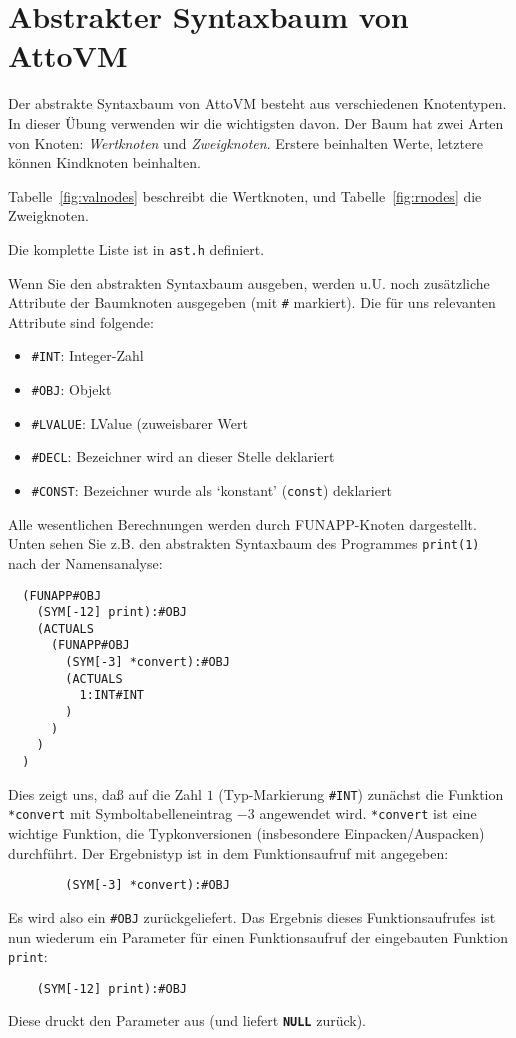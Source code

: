 \documentclass[11pt,a4paper]{article}
\newcommand{\Ckw}[1]{\textbf{\texttt{#1}}}
\begin{document}
\section{Abstrakter Syntaxbaum von AttoVM}\label{a:ast}

Der abstrakte Syntaxbaum von AttoVM besteht aus verschiedenen Knotentypen.  In dieser Übung verwenden wir die wichtigsten davon.
Der Baum hat zwei Arten von Knoten: \emph{Wertknoten} und \emph{Zweigknoten}.  Erstere beinhalten Werte, letztere können
Kindknoten beinhalten.

Tabelle~\ref{fig:valnodes} beschreibt die Wertknoten, und Tabelle~\ref{fig:rnodes} die Zweigknoten.

Die komplette Liste ist in \texttt{ast.h} definiert.

Wenn Sie den abstrakten Syntaxbaum ausgeben, werden u.U. noch
zusätzliche Attribute der Baumknoten ausgegeben (mit \texttt{\#}
markiert).  Die für uns relevanten Attribute sind folgende:

\begin{itemize}
\item   \texttt{\#INT}: Integer-Zahl
\item   \texttt{\#OBJ}: Objekt
\item   \texttt{\#LVALUE}: LValue (zuweisbarer Wert
\item   \texttt{\#DECL}: Bezeichner wird an dieser Stelle deklariert
\item   \texttt{\#CONST}: Bezeichner wurde als `konstant' (\texttt{const}) deklariert
\end{itemize}

Alle wesentlichen Berechnungen werden durch \textsf{FUNAPP}-Knoten dargestellt.  Unten sehen Sie z.B.
den abstrakten Syntaxbaum des Programmes \texttt{print(1)} nach der Namensanalyse:

\begin{verbatim}
  (FUNAPP#OBJ
    (SYM[-12] print):#OBJ
    (ACTUALS
      (FUNAPP#OBJ
        (SYM[-3] *convert):#OBJ
        (ACTUALS
          1:INT#INT
        )
      )
    )
  )
\end{verbatim}

Dies zeigt uns, daß auf die Zahl $1$ (Typ-Markierung \texttt{\#INT}) zunächst die Funktion
\texttt{*convert} mit Symboltabelleneintrag $-3$ angewendet wird.  \texttt{*convert} ist eine wichtige Funktion, die Typkonversionen
(insbesondere Einpacken/Auspacken) durchführt.  Der Ergebnistyp ist in dem Funktionsaufruf mit angegeben:
\begin{verbatim}
        (SYM[-3] *convert):#OBJ
\end{verbatim}
Es wird also ein \texttt{\#OBJ} zurückgeliefert.  Das Ergebnis dieses Funktionsaufrufes ist nun wiederum ein Parameter
für einen Funktionsaufruf der eingebauten Funktion \texttt{print}:
\begin{verbatim}
    (SYM[-12] print):#OBJ
\end{verbatim}
Diese druckt den Parameter aus (und liefert \Ckw{NULL} zurück).
\end{document}
